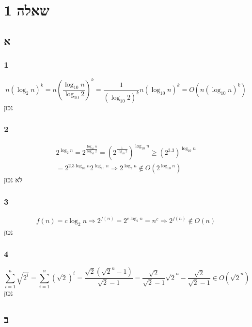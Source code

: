 \documentclass[a4paper]{article}
\begin{document}
\section*{שאלה 1}
\subsection*{א}
\subsubsection*{1}
\begin{equation*}
    n(\log_{2}n)^{k}
    = n(\frac {\log_{10}n}{\log_{10}2})^{k} 
    = \frac{1}{(\log_{10}2)^k} n(\log_{10}n)^k 
    = O(n(\log_{10}n)^k)
\end{equation*}
נכון
\subsubsection*{2}
\begin{equation*}
    \begin{split}
        2^{\log_{2}n} = 2^{\frac{\log_{10}n}{\log_{10}2}}
        = (2^{\frac{1}{\log_{10}2}})^{\log_{10}n}
        \geq (2^{3.3})^{\log_{10}n} \\
        = 2^{2.3 \log_{10}n} 2^{\log_{10}n}
        \Rightarrow 2^{\log_2 n} \notin O(2^{\log_{10}n})
    \end{split}
\end{equation*}
לא נכון
\subsubsection*{3}
\begin{eqnarray*}
    f(n) = c\log_2 n \Rightarrow 2^{f(n)} = 2^{c\log_2 n} = n^c
    \Rightarrow 2^{f(n)} \notin O(n)
\end{eqnarray*}
נכון
\subsubsection*{4}
\begin{equation*}
    \sum\limits_{i = 1}^n \sqrt{2^{i}} = \sum\limits_{i = 1}^n (\sqrt{2})^{i}
    = \frac{\sqrt{2} (\sqrt{2}^n - 1)}{\sqrt{2} - 1}
    = \frac{\sqrt{2}}{\sqrt{2} - 1} \sqrt{2}^n - \frac{\sqrt{2}}{\sqrt{2} - 1}
    \in O(\sqrt{2}^n)
\end{equation*}
נכון
\subsection*{ב}
\end{document}

